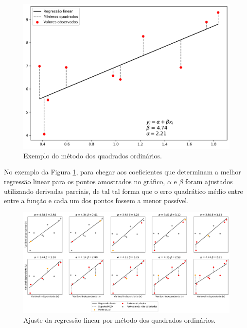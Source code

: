 \begin{figure}[htb]
	\caption{\label{fig:minimos_quadrados}Exemplo do método dos quadrados ordinários.}
	\begin{center}
		\includegraphics[scale=0.6]{figuras/min_sqr.png}
	\end{center}
\end{figure}

No exemplo da Figura \ref{fig:minimos_quadrados}, para chegar aos coeficientes que determinam a melhor regressão linear para os pontos amostrados no gráfico, $\alpha$ e $\beta$ foram ajustados utilizando derivadas parciais, de tal tal forma que o erro quadrático médio entre entre a função e cada um dos pontos fossem a menor possível.

\begin{figure}[htb]
	\caption{\label{fig:ajuste_regressao_linear}Ajuste da regressão linear por método dos quadrados ordinários.}
	\begin{center}
		\includegraphics[scale=0.35]{figuras/ols-steps.png}
	\end{center}
\end{figure}

